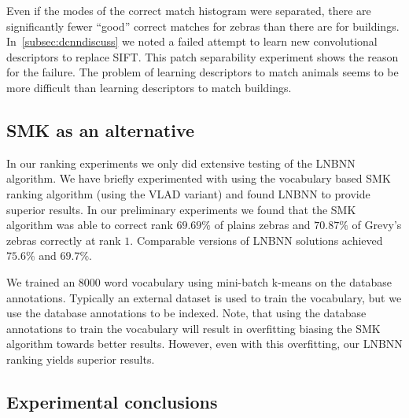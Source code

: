         Even if the modes of the correct match histogram were separated, there are significantly fewer ``good''
          correct matches for zebras than there are for buildings.
        In~\cref{subsec:dcnndiscuss} we noted a failed attempt to learn new convolutional descriptors to replace
          SIFT{}.
        This patch separability experiment shows the reason for the failure.
        The problem of learning descriptors to match animals seems to be more difficult than learning descriptors
          to match buildings.

        \PzVsLibertyPatches{}

        \PzVsLiberty{}


    \subsection{SMK as an alternative}\label{sub:smkalt}  

        In our ranking experiments we only did extensive testing of the LNBNN algorithm.
        We have briefly experimented with using the vocabulary based SMK ranking algorithm (using the VLAD variant)
          and found LNBNN to provide superior results.
        In our preliminary experiments we found that the SMK algorithm was able to correct rank $69.69\percent$ of
          plains zebras and $70.87\percent$ of Grevy's zebras correctly at rank $1$.
        Comparable versions of LNBNN solutions achieved $75.6\percent$ and $69.7\percent$.

        We trained an $8000$ word vocabulary using mini-batch k-means on the database annotations.
        Typically an external dataset is used to train the vocabulary, but we \naively{} use the database
          annotations to be indexed.
        Note, that using the database annotations to train the vocabulary will result in overfitting biasing the
          SMK algorithm towards better results.
        However, even with this overfitting, our LNBNN ranking yields superior results.


    \subsection{Experimental conclusions}\label{sub:exptsum}  

